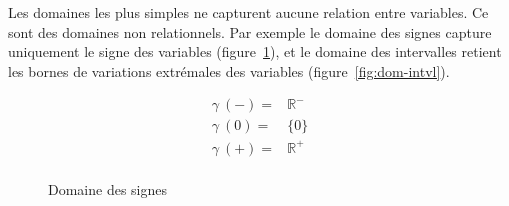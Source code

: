 Les domaines les plus simples ne capturent aucune relation entre variables. Ce
sont des domaines non relationnels. Par exemple le domaine des signes capture
uniquement le signe des variables (figure~\ref{fig:dom-sig}), et le domaine des
intervalles retient les bornes de variations extrémales des variables
(figure~\ref{fig:dom-intvl}).

\begin{figure}%
\centering

\begin{minipage}{0.4\textwidth}
\end{minipage}
\begin{minipage}{0.4\textwidth}
  \begin{align*}
  γ~(-) = & ℝ^- \\
  γ~(0) = & \{0\} \\
  γ~(+) = & ℝ^+ \\
  \end{align*}
\end{minipage}

\caption{Domaine des signes}
\label{fig:dom-sig}
\end{figure}%

